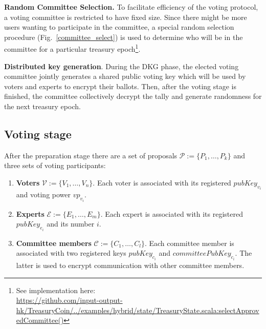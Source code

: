 \textbf{Random Committee Selection.} To facilitate efficiency of the voting protocol, a voting committee is restricted to have fixed size. Since there might be more users wanting to participate in the committee, a special random selection procedure (Fig.~\ref{committee_select}) is used to determine who will be in the committee for a particular treasury epoch\footnote{See implementation here:\\ \href{https://github.com/input-output-hk/TreasuryCoin/blob/master/examples/src/main/scala/examples/hybrid/state/TreasuryState.scala\#L367}{https://github.com/input-output-hk/TreasuryCoin/../examples/hybrid/state/TreasuryState.scala:selectApprovedCommittee()}}.


\textbf{Distributed key generation}. During the DKG phase, the elected voting committee jointly generates a shared public voting key which will be used by voters and experts to encrypt their ballots. Then, after the voting stage is finished, the committee collectively decrypt the tally and generate randomness for the next treasury epoch.

\subsection{Voting stage}
After the preparation stage there are a set of proposals $\mathcal{P}:=\{P_1,\ldots, P_k \}$ and three sets of voting participants:
\begin{enumerate}
    \item \textbf{Voters} $\mathcal{V}:=\{V_1,\ldots, V_n \}$. Each voter is associated with its registered $pubKey_{v_i}$ and voting power $vp_{v_i}$.
    \item \textbf{Experts} $\mathcal{E}:=\{E_1,\ldots, E_m \}$. Each expert is associated with its registered $pubKey_{e_i}$ and its number $i$. 
    \item \textbf{Committee members} $\mathcal{C}:=\{C_1,\ldots, C_l \}$. Each committee member is associated with two registered keys $pubKey_{c_i}$ and $committeePubKey_{c_i}$. The latter is used to encrypt communication with other committee members.
\end{enumerate}

